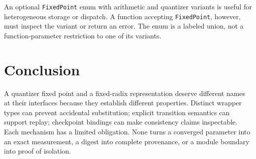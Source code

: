 \documentclass[11pt]{article}
\begin{document}
An optional \texttt{FixedPoint} enum with arithmetic and quantizer variants is useful for heterogeneous storage or dispatch. A function accepting \texttt{FixedPoint}, however, must inspect the variant or return an error. The enum is a labeled union, not a function-parameter restriction to one of its variants.

\section{Conclusion}

A quantizer fixed point and a fixed-radix representation deserve different names at their interfaces because they establish different properties. Distinct wrapper types can prevent accidental substitution; explicit transition semantics can support replay; checkpoint bindings can make consistency claims inspectable. Each mechanism has a limited obligation. None turns a converged parameter into an exact measurement, a digest into complete provenance, or a module boundary into proof of isolation.
\end{document}
